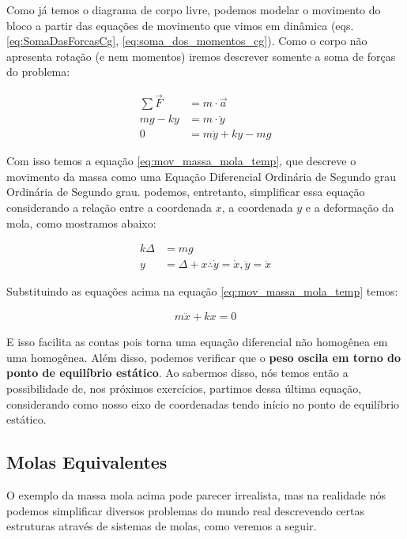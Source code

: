 \documentclass{article}
\newcommand{\n}{\nonumber \\ }
\begin{document}
Como já temos o diagrama de corpo livre, podemos modelar o movimento do bloco a partir das equações de movimento que vimos em dinâmica (eqs. \ref{eq:SomaDasForcasCg},
\ref{eq:soma_dos_momentos_cg}).
Como o corpo não apresenta rotação (e nem momentos) iremos descrever somente a soma de forças do problema:

\begin{align}
    \sum \vec F & = m \cdot \vec a \n
    mg - k y    & = m \cdot \ddot y \n
    0           & = m \ddot y + ky - mg \label{eq:mov_massa_mola_temp}
\end{align}

Com isso temos a equação \ref{eq:mov_massa_mola_temp}, que descreve o movimento da massa como uma Equação Diferencial Ordinária de Segundo grau Ordinária de Segundo grau.
podemos, entretanto, simplificar essa equação considerando a relação entre a coordenada $x$, a coordenada $y$ e a deformação da mola, como mostramos abaixo:

\begin{align}
    k \Delta & = m g                                                      \\
    y        & = \Delta + x \therefore \dot y = \dot x, \ddot y = \ddot x
\end{align}

Substituindo as equações acima na equação \ref{eq:mov_massa_mola_temp} temos:

\begin{align}
    m\ddot x + kx = 0
\end{align}

E isso facilita as contas pois torna uma equação diferencial não homogênea em uma homogênea.
Além disso, podemos verificar que o \textbf{peso oscila em torno do ponto de equilíbrio estático}. Ao sabermos disso, nós temos então a possibilidade de, nos próximos exercícios,
partimos dessa última equação, considerando como nosso eixo de coordenadas tendo início no ponto de equilíbrio estático.

\subsection{Molas Equivalentes}

O exemplo da massa mola acima pode parecer irrealista, mas na realidade nós podemos simplificar diversos problemas do mundo real descrevendo certas estruturas através de sistemas de
molas, como veremos a seguir.
\end{document}
